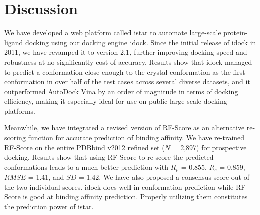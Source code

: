 \documentclass[10pt]{article}
\begin{document}

\section*{Discussion}
We have developed a web platform called istar to automate large-scale protein-ligand docking using our docking engine idock. Since the initial release of idock in 2011, we have revamped it to version 2.1, further improving docking speed and robustness at no significantly cost of accuracy. Results show that idock managed to predict a conformation close enough to the crystal conformation as the first conformation in over half of the test cases across several diverse datasets, and it outperformed AutoDock Vina by an order of magnitude in terms of docking efficiency, making it especially ideal for use on public large-scale docking platforms.

Meanwhile, we have integrated a revised version of RF-Score as an alternative re-scoring function for accurate prediction of binding affinity. We have re-trained RF-Score on the entire PDBbind v2012 refined set ($N$ = 2,897) for prospective docking. Results show that using RF-Score to re-score the predicted conformations leads to a much better prediction with $R_p$ = 0.855, $R_s$ = 0.859, $RMSE$ = 1.41, and $SD$ = 1.42. We have also proposed a consensus score out of the two individual scores. idock does well in conformation prediction while RF-Score is good at binding affinity prediction. Properly utilizing them constitutes the prediction power of istar.
\end{document}
